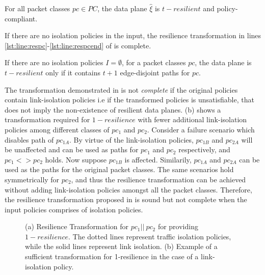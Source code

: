 \begin{theorem}[Soundness]
	For all packet classes $pc \in PC$, the data plane $\hat{\xi}$ is $t-resilient$ 
	and policy-compliant. 
\end{theorem}
\noindent If there are no isolation policies in the input, the resilience transformation in lines 
\ref{lst:line:respc}-\ref{lst:line:respcend} of  is complete.
\begin{theorem}[Completeness]
If there are no isolation policies $I = \emptyset$, 
	for a packet classes $pc$, the data plane  is $t-resilient$ only if it 
	contains $t + 1$ edge-disjoint paths for $pc$.
\end{theorem}

\noindent The transformation demonstrated in  is not \emph{complete}
 if the original policies contain link-isolation policies i.e if the transformed policies
 is unsatisfiable, that does not imply the non-existence of resilient data planes. 
 (b) shows a  transformation required for $1-resilience$ 
 with fewer additional link-isolation policies among different classes
 of $pc_1$ and $pc_2$. Consider a failure scenario which disables path
 of $pc_{1A}$. By virtue of the link-isolation policies, $pc_{1B}$ and
 $pc_{2A}$ will be unaffected and can be used as paths for $pc_1$ 
 and $pc_2$ respectively, and $pc_1 <> pc_2$ holds. Now suppose
 $pc_{1B}$ is affected. Similarily, $pc_{1A}$ and $pc_{2A}$ can be used as
 the paths for the original packet classes. The same scenarios hold symmetrically
 for $pc_2$, and thus the resilience transformation can be achieved without
 adding link-isolation policies amongst all the packet classes. Therefore,
 the resilience transformation proposed in  is sound but not
 complete when the input policies comprises of isolation policies. 
 
\begin{figure}
	\centering
	\caption{\label{fig:restransform}
		(a) Resilience Transformation for $pc_1 || \ pc_2$ for providing $1-resilience$. 
		The dotted lines represent traffic isolation policies, 
		while the solid lines represent link isolation. (b) Example of a sufficient transformation
		for 1-resilience in the case of a link-isolation policy.}
\end{figure}


